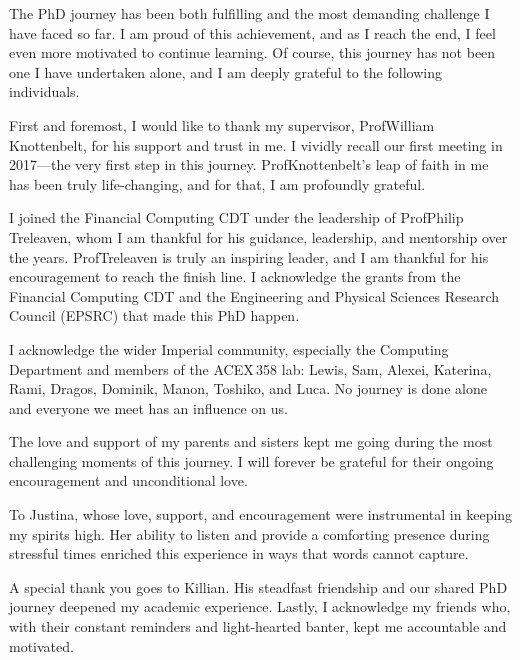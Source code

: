 \cleardoublepage


\begin{acknowledgements}

The PhD journey has been both fulfilling and the most demanding challenge I have faced so far. I am proud of this achievement, and as I reach the end, I feel even more motivated to continue learning. Of course, this journey has not been one I have undertaken alone, and I am deeply grateful to the following individuals.

First and foremost, I would like to thank my supervisor, Prof\;William Knottenbelt, for his support and trust in me. I vividly recall our first meeting in 2017---the very first step in this journey. Prof\;Knottenbelt’s leap of faith in me has been truly life-changing, and for that, I am profoundly grateful.

I joined the Financial Computing CDT under the leadership of Prof\;Philip Treleaven, whom I am thankful for his guidance, leadership, and mentorship over the years. Prof\;Treleaven is truly an inspiring leader, and I am thankful for his encouragement to reach the finish line. I acknowledge the grants from the Financial Computing CDT and the Engineering and Physical Sciences Research Council (EPSRC) that made this PhD happen.

I acknowledge the wider Imperial community, especially the Computing Department and members of the ACEX\,358 lab: Lewis, Sam, Alexei, Katerina, Rami, Dragos, Dominik, Manon, Toshiko, and Luca. No journey is done alone and everyone we meet has an influence on us.

The love and support of my parents and sisters kept me going during the most challenging moments of this journey. I will forever be grateful for their ongoing encouragement and unconditional love.

To Justina, whose love, support, and encouragement were instrumental in keeping my spirits high. Her ability to listen and provide a comforting presence during stressful times enriched this experience in ways that words cannot capture.

A special thank you goes to Killian. His steadfast friendship and our shared PhD journey deepened my academic experience. Lastly, I acknowledge my friends who, with their constant reminders and light-hearted banter, kept me accountable and motivated.


\end{acknowledgements}